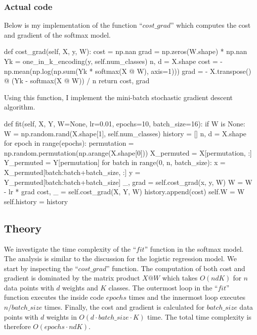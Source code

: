 \documentclass{article}
\begin{document}
\subsubsection*{Actual code}
Below is my implementation of the function ``$cost\_grad$'' which computes the cost and gradient of the softmax model.
\begin{python}
def cost_grad(self, X, y, W):
	cost = np.nan
	grad = np.zeros(W.shape) * np.nan
	Yk = one_in_k_encoding(y, self.num_classes)
	n, d = X.shape
	cost = - np.mean(np.log(np.sum(Yk * softmax(X @ W), axis=1)))
	grad = - X.transpose() @ (Yk - softmax(X @ W)) / n
	return cost, grad
\end{python}
Using this function, I implement the mini-batch stochastic gradient descent algorithm.
\begin{python}
def fit(self, X, Y, W=None, lr=0.01, epochs=10, batch_size=16):
	if W is None:
		W = np.random.rand(X.shape[1], self.num_classes)
	history = []
	n, d = X.shape
	for epoch in range(epochs):
		permutation = np.random.permutation(np.arange(X.shape[0]))
		X_permuted = X[permutation, :]
		Y_permuted = Y[permutation]
		for batch in range(0, n, batch_size):
			x = X_permuted[batch:batch+batch_size, :]
			y = Y_permuted[batch:batch+batch_size]
			_, grad = self.cost_grad(x, y, W)
			W = W - lr * grad
		cost, _ = self.cost_grad(X, Y, W)
		history.append(cost)
	self.W = W
	self.history = history
\end{python}
\subsection*{Theory}
We investigate the time complexity of the ``$fit$'' function in the softmax model.
The analysis is similar to the discussion for the logistic regression model.
We start by inspecting the ``$cost\_grad$'' function.
The computation of both cost and gradient is dominated by the matrix product $X @ W$ which takes $O(ndK)$ for $n$ data points with $d$ weights and $K$ classes.
The outermost loop in the ``$fit$'' function executes the inside code $epochs$ times and the innermost loop executes $n/batch\_size$ times. Finally, the cost and gradient is calculated for $batch\_size$ data points with $d$ weights in $O(d \cdot batch\_size \cdot K)$ time.
The total time complexity is therefore $O(epochs \cdot n d K).$
	
\end{document}
